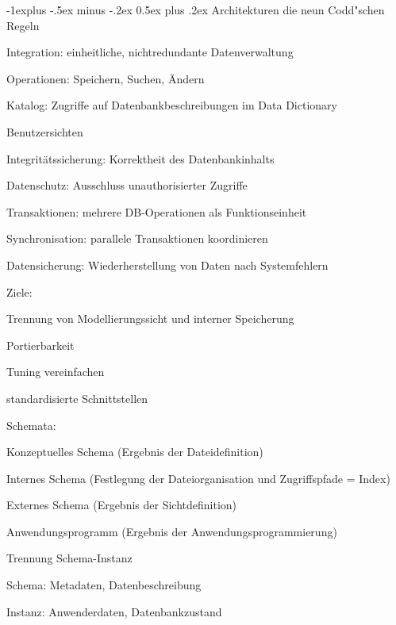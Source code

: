 \documentclass[a4paper]{article}
\makeatletter
\renewcommand{\subsection}{\@startsection{subsection}{2}{0mm}%
                                {-1explus -.5ex minus -.2ex}%
                                {0.5ex plus .2ex}%
                                {\normalfont\normalsize\bfseries}}
\makeatother
\begin{document}
\begin{multicols}{3}
\subsection{Architekturen}
die neun Codd"schen Regeln
\begin{enumerate*}
    \item Integration: einheitliche, nichtredundante Datenverwaltung
    \item Operationen: Speichern, Suchen, Ändern
    \item Katalog: Zugriffe auf Datenbankbeschreibungen im Data Dictionary
    \item Benutzersichten
    \item Integritätssicherung: Korrektheit des Datenbankinhalts
    \item Datenschutz: Ausschluss unauthorisierter Zugriffe
    \item Transaktionen: mehrere DB-Operationen als Funktionseinheit
    \item Synchronisation: parallele Transaktionen koordinieren
    \item Datensicherung: Wiederherstellung von Daten nach Systemfehlern
\end{enumerate*}

Ziele:
\begin{itemize*}
    \item Trennung von Modellierungssicht und interner Speicherung
    \item Portierbarkeit
    \item Tuning vereinfachen
    \item standardisierte Schnittstellen
\end{itemize*}

Schemata:
\begin{itemize*}
    \item Konzeptuelles Schema (Ergebnis der Dateidefinition)
    \item Internes Schema (Festlegung der Dateiorganisation und Zugriffspfade = Index)
    \item Externes Schema (Ergebnis der Sichtdefinition)
    \item Anwendungsprogramm (Ergebnis der Anwendungsprogrammierung)
    \item Trennung Schema-Instanz
    \begin{itemize*}
        \item Schema: Metadaten, Datenbeschreibung
        \item Instanz: Anwenderdaten, Datenbankzustand
    \end{itemize*}
\end{itemize*}


\end{multicols}
\end{document}
